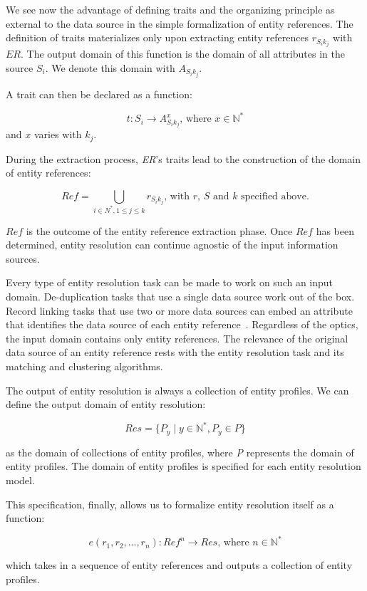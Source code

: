 We see now the advantage of defining traits and the organizing principle as
external to the data source in the simple formalization of entity references.
The definition of traits materializes only upon extracting entity references
$r_{{S_i}{k_j}}$ with $ER$.
The output domain of this function is the domain of all attributes in the source
$S_i$.
We denote this domain with $A_{{S_i}{k_j}}$.

A trait can then be declared as a function:

\[
    t: S_i \rightarrow A_{{S_i}{k_j}}^x\textrm{, where }x \in \mathbb{N}^*
\]
and $x$ varies with $k_j$.

During the extraction process, \textit{ER}'s traits lead to the construction
of the domain of entity references:

\[
    Ref = \bigcup_{i \in N^*,1 \leq j \leq k} r_{{S_i}{k_j}}
    \textrm{, with } r \textrm{, }S \textrm{ and } k \textrm{ specified above.}
\]

$Ref$ is the outcome of the entity reference extraction phase.
Once $Ref$ has been determined, entity resolution can continue agnostic of the
input information sources.

Every type of entity resolution task can be made to work on such an input
domain.
De-duplication tasks that use a single data source work out of the box.
Record linking tasks that use two or more data sources can embed an
attribute that identifies the data source of each entity reference~\cite{Pap19}.
Regardless of the optics, the input domain contains only entity references.
The relevance of the original data source of an entity reference rests with
the entity resolution task and its matching and clustering algorithms.

The output of entity resolution is always a collection of entity profiles.
We can define the output domain of entity resolution:

\[
    Res=\{P_y \mid y \in \mathbb{N^*}, P_y \in P\}
\]

\noindent
as the domain of collections of entity profiles, where \textit{P} represents the
domain of entity profiles.
The domain of entity profiles is specified for each entity resolution model.

This specification, finally, allows us to formalize entity resolution itself as a function:

\[
    e(r_1, r_2, \ldots, r_n): Ref^n \rightarrow Res\text{, where }n\in\mathbb{N^*}
\]

\noindent
which takes in a sequence of entity references and outputs a collection of
entity profiles.

